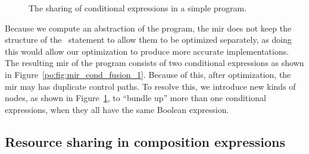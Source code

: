 \begin{figure}[ht]
{\label{po:fig:mir_cond_fusion_2}
    }
    \caption{The sharing of conditional expressions in a simple program.}
\end{figure}

Because we compute an abstraction of the program, the \gls{mir} does not
keep the structure of the \iflit~statement to allow them to be optimized
separately, as doing this would allow our optimization to produce more accurate
implementations.  The resulting \gls{mir} of the program consists of two
conditional expressions as shown in Figure~\ref{po:fig:mir_cond_fusion_1}.
Because of this, after optimization, the \gls{mir} may has duplicate control
paths.  To resolve this, we introduce new kinds of nodes, as shown in
Figure~\ref{po:fig:mir_cond_fusion_2}, to ``bundle up'' more than one
conditional expressions, when they all have the same Boolean expression.


\subsection{Resource sharing in composition expressions}

